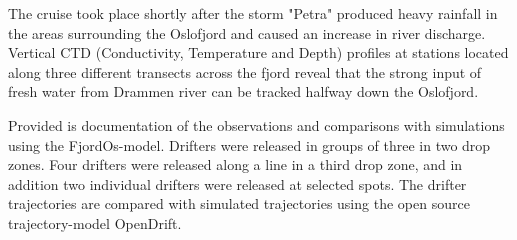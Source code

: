 \documentclass[12pt,a4paper,english]{article}
\begin{document}
The cruise took place shortly after the storm "Petra" produced heavy rainfall in the areas surrounding the Oslofjord and caused an increase in river discharge. Vertical CTD (Conductivity, Temperature and Depth) profiles at stations located along three different transects across the fjord reveal that the strong input of fresh water from Drammen river can be tracked halfway down the Oslofjord.

Provided is documentation of the observations and comparisons with simulations using the FjordOs-model. Drifters were released in groups of three in two drop zones. Four drifters were released along a line in a third drop zone, and in addition two individual drifters were released at selected spots. The drifter trajectories are compared with simulated trajectories using the open source trajectory-model OpenDrift.

\clearpage

\vfill

\end{document}
